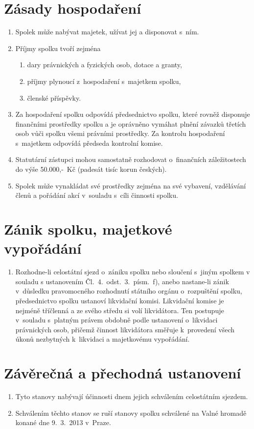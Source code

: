 \documentclass[a4paper]{article}
\begin{document}
\section{Zásady hospodaření}
    \begin{enumerate}
    \item Spolek může nabývat majetek, užívat jej a disponovat s~ním.

    \item Příjmy spolku tvoří zejména
        \begin{enumerate}
        \item dary právnických a fyzických osob, dotace a granty,
        \item příjmy plynoucí z~hospodaření s~majetkem spolku,
        \item členské příspěvky.
        \end{enumerate}

    \item Za hospodaření spolku odpovídá předsednictvo spolku, které
        rovněž disponuje finančními prostředky spolku a je oprávněno vymáhat
        plnění závazků třetích osob vůči spolku všemi právními prostředky.
        Za kontrolu hospodaření s~majetkem odpovídá předseda kontrolní komise.

    \item Statutární zástupci mohou samostatně rozhodovat o~finančních
        záležitostech do výše 50.000,-~Kč (padesát tisíc korun českých).

    \item Spolek může vynakládat své prostředky zejména na své vybavení,
        vzdělávání členů a pořádání akcí v~souladu s~cíli činnosti spolku.
    \end{enumerate}



\section{Zánik spolku, majetkové vypořádání}
    \begin{enumerate}
    \item Rozhodne-li celostátní sjezd o~zániku spolku nebo sloučení s~jiným
        spolkem v souladu s ustanovením Čl.~4.~odst.~3.~písm.~f), anebo
        nastane-li zánik v~důsledku pravomocného rozhodnutí státního orgánu
        o~rozpuštění spolku, předsednictvo spolku ustanoví likvidační
        komisi. Likvidační komise je nejméně tříčlenná a ze svého středu si 
        volí likvidátora. Ten postupuje v~souladu s~platným právem obdobně
        podle ustanovení o~likvidaci právnických osob, přičemž činnost
        likvidátora směřuje k~provedení všech úkonů nezbytných k~likvidaci a
        majetkovému vypořádání.
    \end{enumerate}



\section{Závěrečná a přechodná ustanovení}
    \begin{enumerate}
    \item Tyto stanovy nabývají účinnosti dnem jejich schválením celostátním sjezdem.

    \item Schválením těchto stanov se ruší stanovy spolku schválené na
        Valné hromadě konané dne 9.~3.~2013 v~Praze.

    \end{enumerate}
\end{document}
